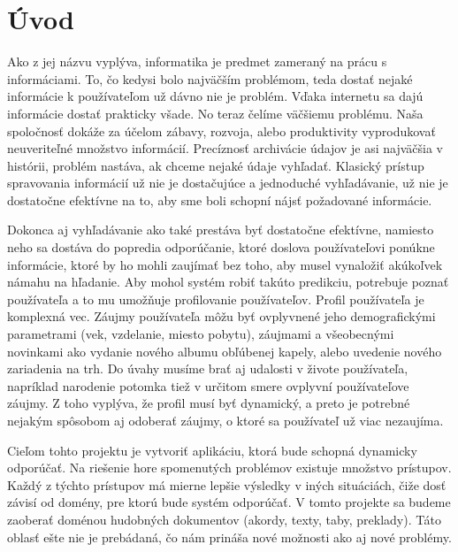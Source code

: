 \newpage 
\setlength{\oddsidemargin}{2.0cm}
\setlength{\evenidemargin}{1.0cm}

\let\oldsection\section
\def\section{\cleardoublepage\oldsection}
\section{Úvod}

Ako z jej názvu vyplýva,
informatika je predmet zameraný na prácu s informáciami.
To, čo kedysi bolo najväčším problémom,
teda dostať nejaké informácie k používateľom
už dávno nie je problém. Vďaka internetu sa dajú informácie dostať prakticky všade.
No teraz čelíme väčšiemu problému.
Naša spoločnosť dokáže za účelom zábavy,
rozvoja, alebo produktivity vyprodukovať neuveriteľné množstvo informácií.
Precíznosť archivácie údajov je asi najväčšia v histórii,
problém nastáva, ak chceme nejaké údaje vyhľadať.
Klasický prístup spravovania informácií už nie je dostačujúce a
jednoduché vyhľadávanie, už nie je dostatočne efektívne na to, aby
sme boli schopní nájsť požadované informácie.

Dokonca aj vyhľadávanie ako také prestáva byť dostatočne efektívne,
namiesto neho sa dostáva do popredia odporúčanie,
ktoré doslova používateľovi ponúkne informácie,
ktoré by ho mohli zaujímať bez toho, aby musel vynaložiť akúkoľvek námahu na hľadanie.
Aby mohol systém robiť takúto predikciu, potrebuje poznať používateľa a
to mu umožňuje profilovanie používateľov.
Profil používateľa je komplexná vec.
Záujmy používateľa môžu byť ovplyvnené jeho demografickými parametrami
(vek, vzdelanie, miesto pobytu),
záujmami a všeobecnými novinkami ako vydanie nového
albumu obľúbenej kapely, alebo uvedenie nového zariadenia na trh.
Do úvahy musíme brať aj udalosti v živote používateľa,
napríklad narodenie potomka tiež v určitom smere ovplyvní používateľove záujmy.
Z toho vyplýva, že profil musí byť dynamický,
a preto je potrebné nejakým spôsobom aj odoberať záujmy,
o ktoré sa používateľ už viac nezaujíma.

Cieľom tohto projektu je vytvoriť aplikáciu, ktorá bude schopná dynamicky odporúčať.
Na riešenie hore spomenutých problémov existuje množstvo prístupov.
Každý z týchto prístupov má mierne lepšie výsledky v iných situáciách,
čiže dosť závisí od domény, pre ktorú bude systém odporúčať.
V tomto projekte sa budeme zaoberať doménou
hudobných dokumentov (akordy, texty, taby, preklady).
Táto oblasť ešte nie je prebádaná,
čo nám prináša nové možnosti ako aj nové problémy.

